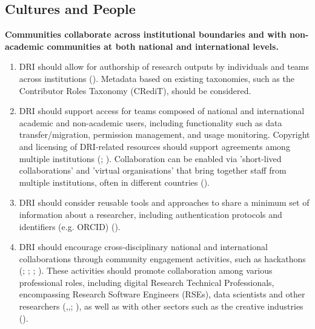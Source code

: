 \documentclass[11pt]{scrartcl}
\begin{document}
\subsection{Cultures and People}

\noindent\textbf{Communities collaborate across institutional boundaries and with non-academic communities at both national and international levels.}  

\begin{enumerate}
\item DRI should allow for authorship of research outputs by individuals and teams across institutions (\cite[5]{evans23}). Metadata based on existing taxonomies, such as the Contributor Roles Taxonomy (CRediT), should be considered.  

\item DRI should support access for teams composed of national and international academic and non-academic users, including functionality such as data transfer/migration, permission management, and usage monitoring. Copyright and licensing of DRI-related resources should support agreements among multiple institutions 
(\cite{de_roure_2022_4716148}; \cite[5]{Zwiggelaar22}). Collaboration can be enabled via 'short-lived collaborations' and 'virtual organisations' that bring together staff from multiple institutions, often in different countries 
(\cite[7]{collier25}).

\item\label{itm:aut} DRI should consider reusable tools and approaches to share a minimum set of information about a researcher, including authentication protocols and identifiers (e.g. ORCID)
(\cite[6]{collier25}).


\item DRI should encourage cross-disciplinary national and international collaborations through community engagement activities, such as hackathons 
(\cite[4]{de_roure_2022_4716148}; \cite[2]{bell_2025_17099176}; \cite[15]{romanova_2021_5105938}; \cite{sichani_2023_8177926}). 
These activities should promote collaboration among various professional roles, including digital Research Technical Professionals, encompassing Research Software Engineers (RSEs), data scientists and other researchers (\cite{step,discourse},\cite[8]{de_roure_2022_4716148},\cite{beavan_2025a_15083396}; \cite[30]{taylor_2022_10518740}), as well as with other sectors such as the creative industries (\cite{romanova_2021_5105938}).  
\end{enumerate}
\end{document}
